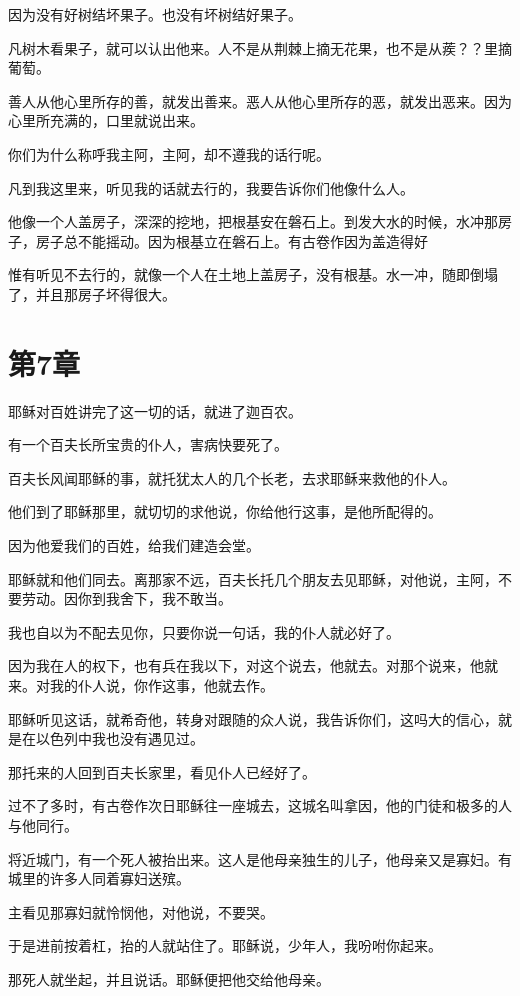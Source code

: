 \documentclass[12pt,oneside]{book}
\begin{document}
因为没有好树结坏果子。也没有坏树结好果子。

凡树木看果子，就可以认出他来。人不是从荆棘上摘无花果，也不是从蒺？？里摘葡萄。

善人从他心里所存的善，就发出善来。恶人从他心里所存的恶，就发出恶来。因为心里所充满的，口里就说出来。

你们为什么称呼我主阿，主阿，却不遵我的话行呢。

凡到我这里来，听见我的话就去行的，我要告诉你们他像什么人。

他像一个人盖房子，深深的挖地，把根基安在磐石上。到发大水的时候，水冲那房子，房子总不能摇动。因为根基立在磐石上。有古卷作因为盖造得好

惟有听见不去行的，就像一个人在土地上盖房子，没有根基。水一冲，随即倒塌了，并且那房子坏得很大。

\chapter{第7章}
耶稣对百姓讲完了这一切的话，就进了迦百农。

有一个百夫长所宝贵的仆人，害病快要死了。

百夫长风闻耶稣的事，就托犹太人的几个长老，去求耶稣来救他的仆人。

他们到了耶稣那里，就切切的求他说，你给他行这事，是他所配得的。

因为他爱我们的百姓，给我们建造会堂。

耶稣就和他们同去。离那家不远，百夫长托几个朋友去见耶稣，对他说，主阿，不要劳动。因你到我舍下，我不敢当。

我也自以为不配去见你，只要你说一句话，我的仆人就必好了。

因为我在人的权下，也有兵在我以下，对这个说去，他就去。对那个说来，他就来。对我的仆人说，你作这事，他就去作。

耶稣听见这话，就希奇他，转身对跟随的众人说，我告诉你们，这吗大的信心，就是在以色列中我也没有遇见过。

那托来的人回到百夫长家里，看见仆人已经好了。

过不了多时，有古卷作次日耶稣往一座城去，这城名叫拿因，他的门徒和极多的人与他同行。

将近城门，有一个死人被抬出来。这人是他母亲独生的儿子，他母亲又是寡妇。有城里的许多人同着寡妇送殡。

主看见那寡妇就怜悯他，对他说，不要哭。

于是进前按着杠，抬的人就站住了。耶稣说，少年人，我吩咐你起来。

那死人就坐起，并且说话。耶稣便把他交给他母亲。
\end{document}
